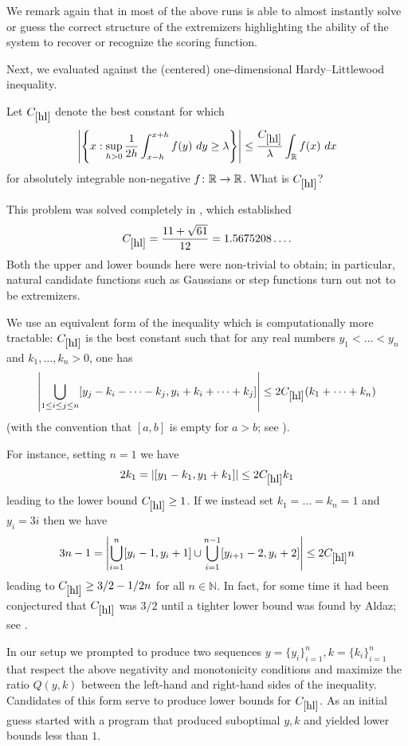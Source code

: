 We remark again that in most of the above runs \AlphaEvolve is able to almost instantly solve or guess the correct structure of the extremizers highlighting the ability of the system to recover or recognize the scoring function.

Next, we evaluated \AlphaEvolve against the (centered) one-dimensional Hardy--Littlewood inequality.

\renewcommand{\problemURL}{https://google-deepmind.github.io/alphaevolve_repository_of_problems/problems/18.html}

\begin{problem}\label{hl}  Let $C_{\ref{hl}}$ denote the best constant for which
$$ \left| \left\{ x: \sup_{h>0} \frac{1}{2h} \int_{x-h}^{x+h} f(y)\ dy \geq \lambda \right\} \right| \leq \frac{C_{\ref{hl}}}{\lambda} \int_{\mathbb{R}} f(x)\ dx$$
for absolutely integrable non-negative $f \colon \mathbb{R} \to \mathbb{R}$.   What is $C_{\ref{hl}}$?
\end{problem}

This problem was solved completely in \cite{melas-1,melas-2}, which established
$$ C_{\ref{hl}} = \frac{11+\sqrt{61}}{12} = 1.5675208\dots.$$
Both the upper and lower bounds here were non-trivial to obtain; in particular, natural candidate functions such as Gaussians or step functions turn out not to be extremizers.

We use an equivalent form of the inequality which is computationally more tractable:  $C_{\ref{hl}}$ is the best constant such that for any real numbers $y_1 < \dots < y_n$ and $k_1,\dots,k_n > 0$, one has
$$ \left| \bigcup_{1 \leq i \leq j \leq n} [y_j - k_i - \dots -k_j, y_i + k_i + \dots + k_j]\right| \leq 2 C_{\ref{hl}} (k_1 + \dots + k_n)$$
(with the convention that $[a, b]$ is empty for $a > b$; see \cite[Lemma 1]{melas-1}).

For instance, setting $n=1$ we have
$$ 2k_1 = |[y_1-k_1, y_1+k_1]| \leq 2 C_{\ref{hl}} k_1$$
leading to the lower bound $C_{\ref{hl}} \geq 1$. If we instead set $k_1=\dots=k_n=1$ and $y_i = 3i$ then we have
$$ 3n-1 = \left|\bigcup_{i=1}^n [y_i-1,y_i+1] \cup \bigcup_{i=1}^{n-1} [y_{i+1}-2, y_i+2]\right| \leq 2 C_{\ref{hl}} n$$
leading to $C_{\ref{hl}} \geq 3/2 - 1/2n$ for all $n \in \mathbb{N}$. In fact, for some time it had been conjectured that $C_{\ref{hl}}$ was $3/2$ until a tighter lower bound was found by Aldaz; see \cite{Aldaz_1998}.

In our setup we prompted \AlphaEvolve to produce two sequences $y = \{y_i\}_{i=1}^n, k=\{k_i\}_{i=1}^n$ that respect the above negativity and monotonicity conditions and maximize the ratio $Q(y, k)$ between the left-hand and right-hand sides of the inequality. Candidates of this form serve to produce lower bounds for $C_{\ref{hl}}$. As an initial guess \AlphaEvolve started with a program that produced suboptimal $y, k$ and yielded lower bounds less than $1$.

